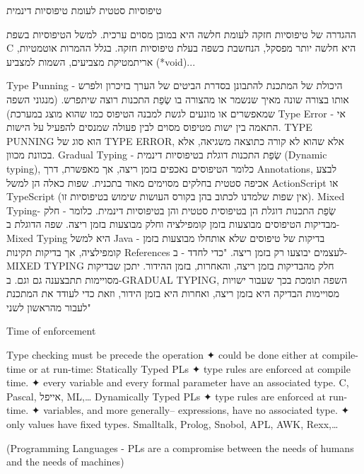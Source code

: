       טיפוסיות סטטית לעומת טיפוסיות דינמית

      ההגדרה של טיפוסיות חזקה לעומת חלשה היא במובן מסוים ערכית.
      למשל הטיפוסיות בשפת C היא חלשה יותר מפסקל, הנחשבת כשפה בעלת טיפוסיות חזקה.
      בגלל ההמרות אוטמטיות, אריתמטיקת מצביעים, השמות למצביע (*void)...

      Type Punning - היכולת של המתכנת להתבונן בסדרת הביטים של הערך בזיכרון ולפרש אותו בצורה שונה מאיך שנשמר או מהצורה בו שְׂפַת התכנות רוצה שיתפרש.
      (מנגוני השפה שמאפשרים או מונעים לגשת למבנה הטיפוס כמו שהוא מוצג במערכת)
      Type Error - אי התאמה בין ישות מטיפוס מסוים לבין פעולה שמנסים להפעיל על הישות.
      TYPE PUNNING הוא סוג של TYPE ERROR, אלא שהוא לא קורה כתוצאה משגיאה, אלא בכוונת מכוון.
      Gradual Typing - שְׂפַת התכנות דוגלת בטיפוסיות דינמית (Dynamic typing), כלומר הטיפוסים נאכפים בזמן ריצה, אך מאפשרת, דרך Annotations, לבצע אכיפה סטטית בחלקים מסוימים מאוד בתכנית. שפות כאלה הן למשל ActionScript או TypeScript (אין שפות שלמדנו לכתוב בהן בקורס העושות שימוש בטיפוסיות זו).
      Mixed Typing- שְׂפַת התכנות דוגלת הן בטיפוסית סטטית והן בטיפוסיות דינמית. כלומר - חלק מבדיקות הטיפוסים מבוצעות בזמן קומפילציה וחלק מבוצעות בזמן ריצה. שפה הדוגלת ב-Mixed Typing היא למשל Java - בדיקות של טיפוסים שלא אותחלו מבוצעות בזמן קומפילציה, אך בדיקות תקינות References לעצמים יבוצעו רק בזמן ריצה.
      "כדי לחדד - ב-MIXED TYPING חלק מהבדיקות בזמן ריצה, והאחרות, בזמן ההידור. יתכן שבדיקות מסויימות תתבצענה גם וגם.
      ב-GRADUAL TYPING, השפה תומכת בכך שעבור ישויות מסויימות הבדיקה היא בזמן ריצה, ואחרות היא בזמן הידור, וזאת כדי לעודד את המתכנת לעבור מהראשון לשני"

      Time of enforcement
      \begin{ציינון}
\item Type checking must be precede the operation
              ✦ could be done either at compile-time or at run-time:
              Statically Typed PLs
              ✦ type rules are enforced at compile time.
              ✦ every variable and every formal parameter have
              an associated type.
              C, Pascal, אייפל, ML,…
              Dynamically Typed PLs
              ✦ type rules are enforced at run-time.
              ✦ variables, and more generally– expressions,
              have no associated type.
              ✦ only values have fixed types.
              Smalltalk, Prolog, Snobol, APL, AWK, Rexx,…
      \end{ציינון}

      (Programming Languages - PLs are a compromise
      between the needs of humans and the needs of machines)

